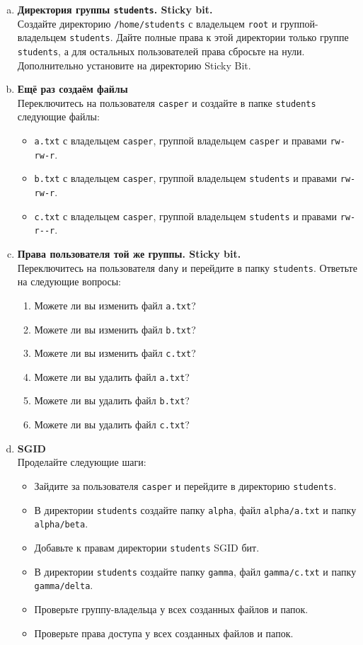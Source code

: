 \documentclass{article}
\begin{document}
\begin{enumerate}[a.]
\item \textbf{Директория группы \texttt{students}. Sticky bit.}\\
Создайте директорию \texttt{/home/students} с владельцем \texttt{root} и группой-владельцем \texttt{students}. Дайте полные права к этой директории только группе \texttt{students}, а для остальных пользователей права сбросьте на нули. Дополнительно установите на директорию Sticky Bit.

\item \textbf{Ещё раз создаём файлы}\\
Переключитесь на пользователя \texttt{casper} и создайте в папке \texttt{students} следующие файлы:
\begin{itemize}
\item \texttt{a.txt} с владельцем \texttt{casper}, группой владельцем \texttt{casper} и правами \texttt{rw-rw-r}.
\item \texttt{b.txt} с владельцем \texttt{casper}, группой владельцем \texttt{students} и правами \texttt{rw-rw-r}.
\item \texttt{c.txt} с владельцем \texttt{casper}, группой владельцем \texttt{students} и правами \texttt{rw-r-{}-r}.
\end{itemize}

\item \textbf{Права пользователя той же группы. Sticky bit.}\\
Переключитесь на пользователя \texttt{dany} и перейдите в папку \texttt{students}. Ответьте на следующие вопросы:
\begin{enumerate}
\item Можете ли вы изменить файл \texttt{a.txt}?
\item Можете ли вы изменить файл \texttt{b.txt}?
\item Можете ли вы изменить файл \texttt{c.txt}?
\item Можете ли вы удалить файл \texttt{a.txt}?
\item Можете ли вы удалить файл \texttt{b.txt}?
\item Можете ли вы удалить файл \texttt{c.txt}?
\end{enumerate}

\item \textbf{SGID}\\
Проделайте следующие шаги:
\begin{itemize}
\item Зайдите за пользователя \texttt{casper} и перейдите в директорию \texttt{students}.
\item В директории \texttt{students} создайте папку \texttt{alpha}, файл \texttt{alpha/a.txt} и папку \texttt{alpha/beta}.
\item Добавьте к правам директории \texttt{students} SGID бит.
\item В директории \texttt{students} создайте папку \texttt{gamma}, файл \texttt{gamma/c.txt} и папку \texttt{gamma/delta}.
\item Проверьте группу-владельца у всех созданных файлов и папок.
\item Проверьте права доступа у всех созданных файлов и папок.
\end{itemize}




\end{enumerate}
\end{document}
